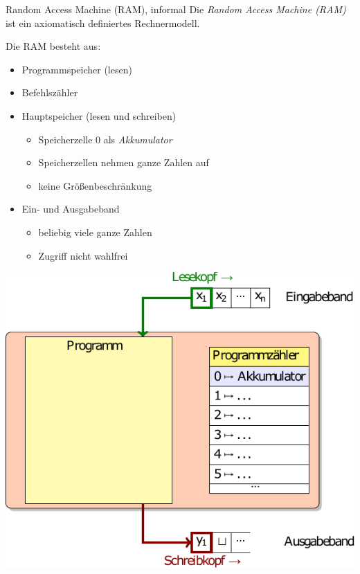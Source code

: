 \documentclass[german]{../spicker}
\begin{document}
\begin{defi}{Random Access Machine (RAM), informal}
  Die \emph{Random Access Machine (RAM)} ist ein axiomatisch definiertes Rechnermodell.

  Die RAM besteht aus:
  \begin{itemize}
    \item Programmspeicher (lesen)
    \item Befehlszähler
    \item Hauptspeicher (lesen und schreiben)
          \begin{itemize}
            \item Speicherzelle 0 als \emph{Akkumulator}
            \item Speicherzellen nehmen ganze Zahlen auf
            \item keine Größenbeschränkung
          \end{itemize}
    \item Ein- und Ausgabeband
          \begin{itemize}
            \item beliebig viele ganze Zahlen
            \item Zugriff nicht wahlfrei
          \end{itemize}
  \end{itemize}

  \begin{center}
    \includegraphics[]{images/ram.pdf}
  \end{center}
\end{defi}
\end{document}
